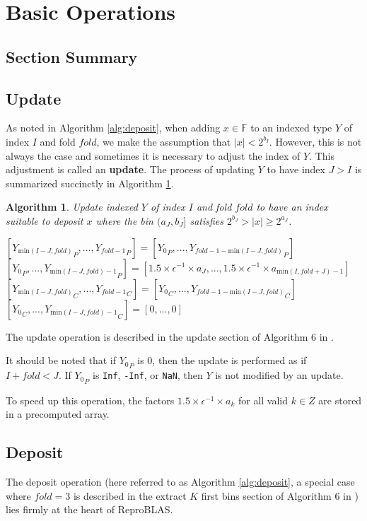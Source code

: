 \documentclass[12pt]{article}
\providecommand{\F}{\ensuremath{\mathbb{F}}}
\providecommand{\min}{\ensuremath{\text{min}}}
\theoremstyle{plain}
\newtheorem{alg}{Algorithm}[section]
\numberwithin{equation}{section}
\begin{document}
\section{Basic Operations}
  \subsection{Section Summary}
  \subsection{Update}
    As noted in Algorithm \ref{alg:deposit}, when adding $x \in \F$ to an indexed type $Y$ of index $I$ and fold $fold$, we make the assumption that $|x| < 2^{b_I}$. However, this is not always the case and sometimes it is necessary to adjust the index of $Y$. This adjustment is called an \textbf{update}. The process of updating $Y$ to have index $J > I$ is summarized succinctly in Algorithm \ref{alg:update}.
    \begin{alg}
      Update indexed $Y$ of index $I$ and fold $fold$ to have an index suitable to deposit $x$ where the bin $(a_{J}, b_{J}]$ satisfies $2^{b_{J}} > |x| \geq 2^{a_{J}}$.
      \begin{algorithmic}[1]
            \State $[{Y_{\min(I - J, fold)}}_P, ..., {Y_{fold - 1}}_P] = [{Y_0}_P, ..., {Y_{fold - 1 - \min(I - J, fold)}}_P]$
            \State $[{Y_0}_P, ..., {Y_{\min(I - J, fold) - 1}}_P] = [1.5 \times \epsilon^{-1} \times a_{J}, ..., 1.5 \times \epsilon^{-1} \times a_{\min(I, fold + J) - 1}]$
            \State $[{Y_{\min(I - J, fold)}}_C, ..., {Y_{fold - 1}}_C] = [{Y_0}_C, ..., {Y_{fold - 1 - \min(I - J, fold)}}_C]$
            \State $[{Y_0}_C, ..., {Y_{\min(I - J, fold) - 1}}_C] = [0, ..., 0]$
          \EndIf
        \EndFunction
      \end{algorithmic}
      \label{alg:update}
    \end{alg}
    The update operation is described in the update section of Algorithm $6$ in \cite{repsum}.

    It should be noted that if ${Y_0}_P$ is 0, then the update is performed as if $I + fold < J$. If ${Y_0}_P$ is \verb|Inf|, \verb|-Inf|, or \verb|NaN|, then $Y$ is not modified by an update.

    To speed up this operation, the factors $1.5 \times \epsilon^{-1} \times a_k$ for all valid $k \in Z$ are stored in a precomputed array.

  \subsection{Deposit}
    The deposit operation (here referred to as Algorithm \ref{alg:deposit}, a special case where $fold = 3$ is described in the extract $K$ first bins section of Algorithm $6$ in \cite{repsum}) lies firmly at the heart of ReproBLAS.
\end{document}
